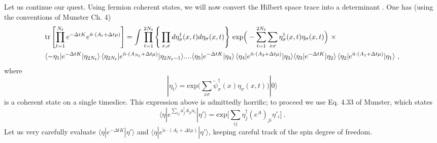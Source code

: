Let us continue our quest. Using fermion coherent states, we will now convert the Hilbert space trace into a determinant . One has (using the conventions of Munster Ch. 4)
\begin{align*}
& \text{tr}\left[\prod_{t=1}^{N_t} e^{-\Delta t K }  e^{ \tilde{n}\cdot (A_t + \Delta t \mu) } \right]  
= 
\int{} \prod_{t=1}^{2N_t} \Bigg\{ \prod_{x, \sigma} d \eta^{\dagger}_{\sigma}(x,t) d\eta_{\sigma}(x,t) \Bigg\} ~ \text{exp}\Big(- \sum_{t=1}^{2N_t}\sum_{x \sigma} \eta^{\dagger}_{\sigma}(x,t) \eta_{\sigma}(x,t)\Big)~ \times \\
& \langle -\eta_1 | e^{-\Delta t K} | \eta_{2 N_t} \rangle \, \langle \eta_{2 N_t} | e^{ \tilde{n} \cdot (A_{N_t} + \Delta t \mu)} | \eta_{2 N_t -1} \rangle ....
\langle \eta_5 | e^{-\Delta t K} | \eta_4 \rangle \, \langle \eta_4 | e^{ \tilde{n} \cdot (A_2 +\Delta t \mu)} | \eta_3 \rangle
\langle \eta_3 | e^{-\Delta t K } | \eta_2 \rangle \, \langle \eta_2 | e^{ \tilde{n} \cdot (A_1 + \Delta t \mu)} | \eta_1 \rangle~,
\end{align*}
where 
\begin{equation*}
| \eta_t \rangle = \text{exp}\Big( \sum_{x \sigma} \tilde{\psi}^{\dagger}_{\sigma}(x) \eta_{\sigma}(x,t) \Big) | 0 \rangle
\end{equation*}
is a coherent state on a single timeslice. This expression above is admittedly horrific; to proceed we use Eq. 4.33 of Munster, which states
\begin{equation}
\langle \eta | e^{\sum_{ij} a^{\dagger}_j A_{ji} a_i} | \eta' \rangle = \text{exp}\Bigg[ \sum_{i j} \eta^{\dagger}_j (e^A)_{ji} \eta'_i \Bigg]~.
\end{equation}
Let us very carefully evaluate $\langle \eta | e^{-\Delta t K} | \eta' \rangle$ and $\langle \eta | e^{\tilde{n} \cdot(A_t + \Delta t \mu)} | \eta' \rangle$, keeping careful track of the spin degree of freedom. 
